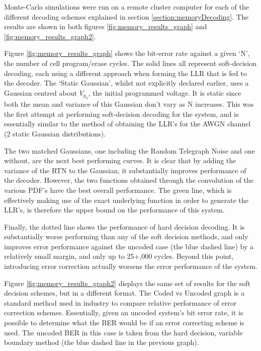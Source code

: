 \documentclass[11pt]{article}
\numberwithin{equation}{subsection}
\begin{document}
Monte-Carlo simulations were run on a remote cluster computer for each of the different decoding schemes explained in section \ref{section:memoryDecoding}. The results are shown in both figures \ref{fig:memory_results_graph} and \ref{fig:memory_results_graph2}.

Figure \ref{fig:memory_results_graph} shows the bit-error rate against a given `N', the number of cell program/erase cycles. The solid lines all represent soft-decision decoding, each using a different approach when forming the LLR that is fed to the decoder. The `Static Gaussian', whilst not explicitly declared earlier, uses a Gaussian centred about $V_{p_0}$, the initial programmed voltage. It is static since both the mean and variance of this Gaussian don't vary as N increases. This was the first attempt at performing soft-decision decoding for the system, and is essentially similar to the method of obtaining the LLR's for the AWGN channel (2 static Gaussian distributions).

The two matched Gaussians, one including the Random Telegraph Noise and one without, are the next best performing curves. It is clear that by adding the variance of the RTN to the Gaussian, it substantially improves performance of the decoder. However, the two functions obtained through the convolution of the various PDF's have the best overall performance. The green line, which is effectively making use of the exact underlying function in order to generate the LLR's, is therefore the upper bound on the performance of this system. 

Finally, the dotted line shows the performance of hard decision decoding. It is substantially worse performing than any of the soft decision methods, and only improves error performance against the uncoded case (the blue dashed line) by a relatively small margin, and only up to 25+,000 cycles. Beyond this point, introducing error correction actually worsens the error performance of the system. 

Figure \ref{fig:memory_results_graph2} displays the same set of results for the soft decision schemes, but in a different format. The Coded vs Uncoded graph is a standard method used in industry to compare relative performance of error correction schemes. Essentially, given an uncoded system's bit error rate, it is possible to determine what the BER would be if an error correcting scheme is used. The uncoded BER in this case is taken from the hard decision, variable boundary method (the blue dashed line in the previous graph).
\end{document}
